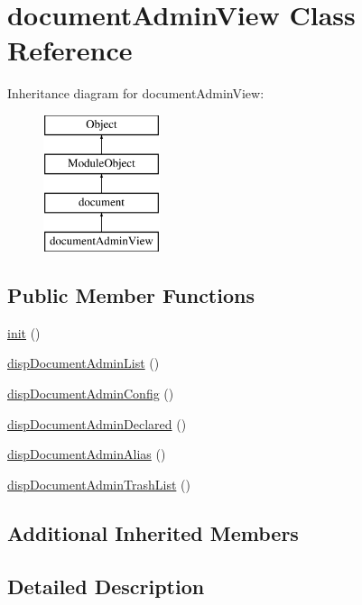 \hypertarget{classdocumentAdminView}{}\section{document\+Admin\+View Class Reference}
\label{classdocumentAdminView}
Inheritance diagram for document\+Admin\+View\+:\begin{figure}[H]
\begin{center}
\leavevmode
\includegraphics[height=4.000000cm]{classdocumentAdminView}
\end{center}
\end{figure}
\subsection*{Public Member Functions}
\begin{DoxyCompactItemize}
\item 
\hyperlink{classdocumentAdminView_aed09978af62e856f18f80e8573968c3c}{init} ()
\item 
\hyperlink{classdocumentAdminView_a522a3fbd85960249d098fd1b8e5a0117}{disp\+Document\+Admin\+List} ()
\item 
\hyperlink{classdocumentAdminView_a4b41049c99341fbb4a782da55d3737e5}{disp\+Document\+Admin\+Config} ()
\item 
\hyperlink{classdocumentAdminView_ad94b3d2db90d0912e4f24a1efb9bff46}{disp\+Document\+Admin\+Declared} ()
\item 
\hyperlink{classdocumentAdminView_a7f9210670150395b7ef8c6209ce0ac53}{disp\+Document\+Admin\+Alias} ()
\item 
\hyperlink{classdocumentAdminView_a677a59c8ecf38161449f397e85f22fa4}{disp\+Document\+Admin\+Trash\+List} ()
\end{DoxyCompactItemize}
\subsection*{Additional Inherited Members}


\subsection{Detailed Description}


